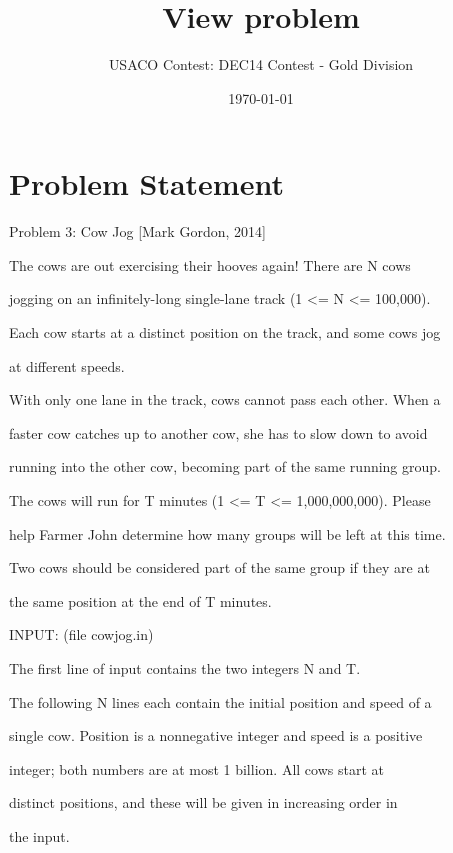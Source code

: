 \documentclass[12pt]{article}
\title{View problem}
\author{USACO Contest: DEC14 Contest - Gold Division}
\date{\today}
\begin{document}
\maketitle

\section*{Problem Statement}

Problem 3: Cow Jog [Mark Gordon, 2014]



The cows are out exercising their hooves again!  There are N cows

jogging on an infinitely-long single-lane track (1 <= N <= 100,000).

Each cow starts at a distinct position on the track, and some cows jog

at different speeds.



With only one lane in the track, cows cannot pass each other.  When a

faster cow catches up to another cow, she has to slow down to avoid

running into the other cow, becoming part of the same running group.



The cows will run for T minutes (1 <= T <= 1,000,000,000).  Please

help Farmer John determine how many groups will be left at this time.

Two cows should be considered part of the same group if they are at

the same position at the end of T minutes.



INPUT: (file cowjog.in)



The first line of input contains the two integers N and T.



The following N lines each contain the initial position and speed of a

single cow.  Position is a nonnegative integer and speed is a positive

integer; both numbers are at most 1 billion.  All cows start at 

distinct positions, and these will be given in increasing order in

the input.
\end{document}
